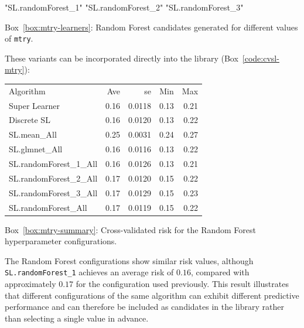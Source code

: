 \documentclass[12pt]{article}
\newcommand{\routputcaption}[2]{%
    \par\smallskip
    \begin{center}
        Box~\ref{#1}: #2
    \end{center}
}
\begin{document}
\begin{routputref}[label={box:mtry-learners}]
	[1] "SL.randomForest_1" "SL.randomForest_2" "SL.randomForest_3"
\end{routputref}

\routputcaption{box:mtry-learners}
{Random Forest candidates generated for different values of \texttt{mtry}.}

These variants can be incorporated directly into the library (Box~\ref{code:cvsl-mtry}):


\begin{routputboxref}[label={box:mtry-summary}]
	\ttfamily
	\centering
	\begin{tabular}{lrrrr}
		Algorithm & Ave & se & Min & Max \\
		Super Learner & 0.16 & 0.0118 & 0.13 & 0.21 \\
		Discrete SL & 0.16 & 0.0120 & 0.13 & 0.22 \\
		SL.mean\_All & 0.25 & 0.0031 & 0.24 & 0.27 \\
		SL.glmnet\_All & 0.16 & 0.0116 & 0.13 & 0.22 \\
		SL.randomForest\_1\_All & 0.16 & 0.0126 & 0.13 & 0.21 \\
		SL.randomForest\_2\_All & 0.17 & 0.0120 & 0.15 & 0.22 \\
		SL.randomForest\_3\_All & 0.17 & 0.0129 & 0.15 & 0.23 \\
		SL.randomForest\_All & 0.17 & 0.0119 & 0.15 & 0.22 \\
	\end{tabular}
\end{routputboxref}

\routputcaption{box:mtry-summary}
{Cross-validated risk for the Random Forest hyperparameter configurations.}

The Random Forest configurations show similar risk values, although \texttt{SL.randomForest\_1} achieves an average risk of $0.16$, compared with approximately $0.17$ for the configuration used previously. This result illustrates that different configurations of the same algorithm can exhibit different predictive performance and can therefore be included as candidates in the library rather than selecting a single value in advance.
\end{document}
